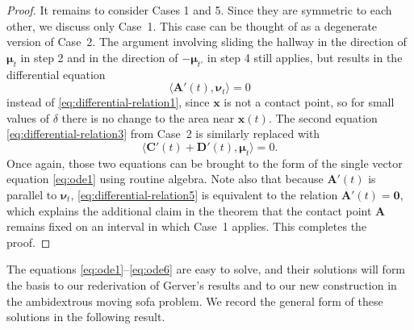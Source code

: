 \documentclass[11pt]{article}
\newcommand{\nvecone}{\boldsymbol{\mu}}
\newcommand{\nvectwo}{\boldsymbol{\nu}}
\begin{document}
\begin{proof}
It remains to consider Cases 1 and 5. Since they are symmetric to each other, we discuss only Case~1. This case can be thought of as a degenerate version of Case~2. The argument involving sliding the hallway in the direction of $\nvecone_t$ in step 2 and in the direction of $-\nvecone_{t'}$ in step 4 still applies, but results in the differential equation
\begin{equation} \label{eq:differential-relation5}
\Big\langle \mathbf{A}'(t), \nvectwo_t \Big\rangle  = 0
\end{equation}
instead of \eqref{eq:differential-relation1},
since $\mathbf{x}$ is not a contact point, so for small values of $\delta$ there is no change to the area near $\mathbf{x}(t)$. The second equation \eqref{eq:differential-relation3} from Case~2 is similarly replaced 
with
\begin{equation} \label{eq:differential-relation6}
\Big\langle \mathbf{C}'(t)  + \mathbf{D}'(t), \nvecone_t \Big\rangle  = 0.
\end{equation}
Once again, those two equations can be brought to the form of the single vector equation \eqref{eq:ode1} using routine algebra. Note also that because $\mathbf{A}'(t)$ is parallel to $\nvectwo_t$, \eqref{eq:differential-relation5} is equivalent to the relation $\mathbf{A}'(t)=\mathbf{0}$, which explains the additional claim in the theorem that the contact point $\mathbf{A}$ remains fixed on an interval in which Case~1 applies.
This completes the proof.
\end{proof}

The equations \eqref{eq:ode1}--\eqref{eq:ode6} are easy to solve, and their solutions will form the basis to our rederivation of Gerver's results and to our new construction in the ambidextrous moving sofa problem. We record the general form of these solutions in the following result.
\end{document}
